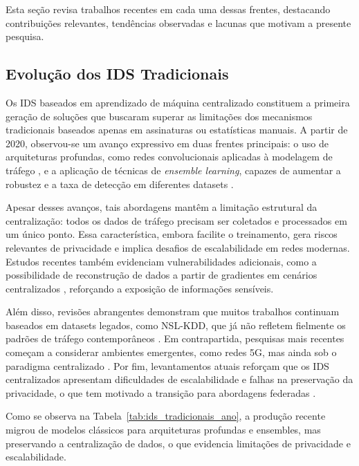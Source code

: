 \documentclass[
	12pt,				%
	openright,			%
	oneside,			%
	a4paper,			%
	english,			%
	french,				%
	spanish,			%
	brazil,				%
	]{abntex2}
\begin{document}
Esta seção revisa trabalhos recentes em cada uma dessas frentes, destacando contribuições relevantes, tendências observadas e lacunas que motivam a presente pesquisa.

\subsection{Evolução dos IDS Tradicionais}
\label{subsec:evolucao_ids_tradicionais}

Os IDS baseados em aprendizado de máquina centralizado constituem a primeira geração de soluções que buscaram superar as limitações dos mecanismos tradicionais baseados apenas em assinaturas ou estatísticas manuais. A partir de 2020, observou-se um avanço expressivo em duas frentes principais: o uso de arquiteturas profundas, como redes convolucionais aplicadas à modelagem de tráfego \cite{tang2022fedids}, e a aplicação de técnicas de \textit{ensemble learning}, capazes de aumentar a robustez e a taxa de detecção em diferentes datasets \cite{lucas2023ensembleids}. 

Apesar desses avanços, tais abordagens mantêm a limitação estrutural da centralização: todos os dados de tráfego precisam ser coletados e processados em um único ponto. Essa característica, embora facilite o treinamento, gera riscos relevantes de privacidade e implica desafios de escalabilidade em redes modernas. Estudos recentes também evidenciam vulnerabilidades adicionais, como a possibilidade de reconstrução de dados a partir de gradientes em cenários centralizados \cite{yang2023deepleakage}, reforçando a exposição de informações sensíveis.

Além disso, revisões abrangentes demonstram que muitos trabalhos continuam baseados em datasets legados, como NSL-KDD, que já não refletem fielmente os padrões de tráfego contemporâneos \cite{lucas2023ensembleids}. Em contrapartida, pesquisas mais recentes começam a considerar ambientes emergentes, como redes 5G, mas ainda sob o paradigma centralizado \cite{alshammari2024springerids}. Por fim, levantamentos atuais reforçam que os IDS centralizados apresentam dificuldades de escalabilidade e falhas na preservação da privacidade, o que tem motivado a transição para abordagens federadas \cite{belenguer2025surveyfedids}.

Como se observa na Tabela~\ref{tab:ids_tradicionais_ano}, a produção recente migrou de
modelos clássicos para arquiteturas profundas e ensembles, mas preservando a centralização
de dados, o que evidencia limitações de privacidade e escalabilidade.
\end{document}
